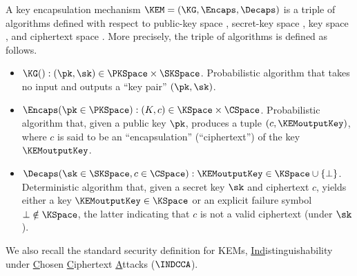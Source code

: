 	\begin{definition}\label{def:KEM}
		A key encapsulation mechanism $\KEM = (\KG, \Encaps, \Decaps)$ is a triple of algorithms
		defined with respect to public-key space \PKSpace, secret-key space \SKSpace,
		key space \KSpace, and ciphertext space \CSpace.
		More precisely, the triple of algorithms is defined as follows.
		\begin{itemize}
			\item
				$\KG() : (\pk, \sk) \in \PKSpace \times \SKSpace$.
				Probabilistic algorithm that takes no input and outputs a ``key pair'' $(\pk, \sk)$.
			\item
				$\Encaps(\pk \in \PKSpace) : (K, c) \in \KSpace \times \CSpace$.
				Probabilistic algorithm that, given a public key $\pk$,
				produces a tuple $(c,\KEMoutputKey)$,
				where $c$ is said to be an ``encapsulation'' (``ciphertext'') of the key $\KEMoutputKey$.
			\item
				$\Decaps(\sk \in \SKSpace, c \in \CSpace) : \KEMoutputKey \in \KSpace \cup \{\bot\}$.
				Deterministic algorithm that, given a secret key $\sk$ and ciphertext $c$,
				yields either a key $\KEMoutputKey \in \KSpace$ or an explicit failure symbol $\bot \notin \KSpace$,
				the latter indicating that $c$ is not a valid ciphertext (under $\sk$).
		\end{itemize}
	\end{definition}
	
	We also recall the standard security definition for KEMs,
	\underline{Ind}istinguishability under \underline{C}hosen \underline{C}iphertext \underline{A}ttacks ($\INDCCA$).
	
